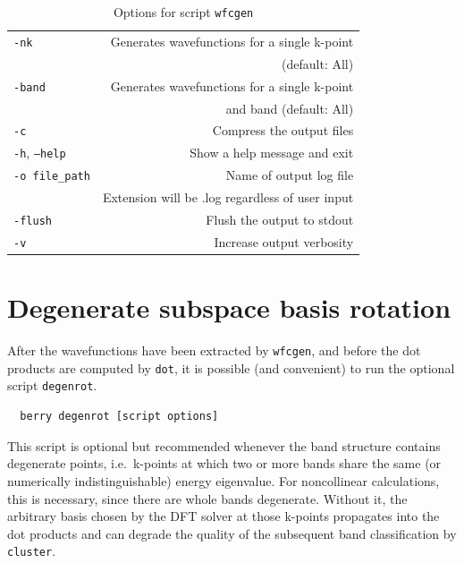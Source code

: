 \documentclass[a4paper,12pt]{report}
\begin{document}
\begin{table}[ht]
 \centering
 \caption{Options for script \texttt{wfcgen}}\label{tab:options_wfcgen}
\begin{tabular}[]{lr}
\hline
  \texttt{-nk}                  & Generates wavefunctions for a single k-point  \\
                                &  (default: All) \\
  \texttt{-band}                & Generates wavefunctions for a single k-point\\
                                &  and band (default: All) \\
  \texttt{-c}                   & Compress the output files \\
  \texttt{-h}, \texttt{--help}  &\hspace*{2cm} Show a help message and exit \\
  \texttt{-o file\_path}        & Name of output log file\\
                                & Extension will be .log regardless of user input \\
  \texttt{-flush}               & Flush the output to stdout \\
  \texttt{-v}                   & Increase output verbosity \\
  \hline
\end{tabular}
\end{table}


\section{Degenerate subspace basis rotation}\label{sec:degenrot}

After the wavefunctions have been extracted by \texttt{wfcgen}, and before the
dot products are computed by \texttt{dot}, it is possible (and convenient) to run the optional
script \texttt{degenrot}.

\begin{verbatim}
  berry degenrot [script options]
\end{verbatim}

This script is optional but recommended whenever the band structure contains
degenerate points, i.e.\ k-points at which two or more bands share the same
(or numerically indistinguishable) energy eigenvalue. For noncollinear calculations,
this is necessary, since there are whole bands degenerate.
Without it, the arbitrary basis chosen by the DFT
solver at those k-points propagates into the dot products and can degrade the
quality of the subsequent band classification by \texttt{cluster}.
\end{document}
